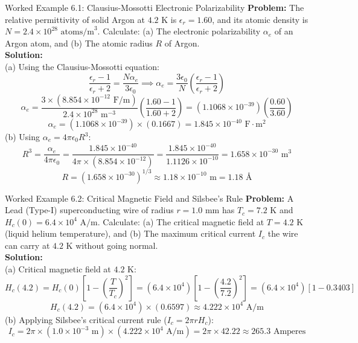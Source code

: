\begin{examplebox}{Worked Example 6.1: Clausius-Mossotti Electronic Polarizability}
\textbf{Problem:} The relative permittivity of solid Argon at $4.2\text{ K}$ is $\epsilon_r = 1.60$, and its atomic density is $N = 2.4 \times 10^{28}\text{ atoms/m}^3$. Calculate: (a) The electronic polarizability $\alpha_e$ of an Argon atom, and (b) The atomic radius $R$ of Argon.\\
\textbf{Solution:}\\
(a) Using the Clausius-Mossotti equation:
\[
\frac{\epsilon_r - 1}{\epsilon_r + 2} = \frac{N \alpha_e}{3\epsilon_0} \implies \alpha_e = \frac{3\epsilon_0}{N}\left(\frac{\epsilon_r - 1}{\epsilon_r + 2}\right)
\]
\[
\alpha_e = \frac{3 \times (8.854 \times 10^{-12}\text{ F/m})}{2.4 \times 10^{28}\text{ m}^{-3}} \left(\frac{1.60 - 1}{1.60 + 2}\right) = (1.1068 \times 10^{-39})\left(\frac{0.60}{3.60}\right)
\]
\[
\alpha_e = (1.1068 \times 10^{-39}) \times (0.1667) = 1.845 \times 10^{-40}\text{ F}\cdot\text{m}^2
\]
(b) Using $\alpha_e = 4\pi\epsilon_0 R^3$:
\[
R^3 = \frac{\alpha_e}{4\pi\epsilon_0} = \frac{1.845 \times 10^{-40}}{4\pi \times (8.854 \times 10^{-12})} = \frac{1.845 \times 10^{-40}}{1.1126 \times 10^{-10}} = 1.658 \times 10^{-30}\text{ m}^3
\]
\[
R = (1.658 \times 10^{-30})^{1/3} \approx 1.18 \times 10^{-10}\text{ m} = 1.18\text{ \AA}
\]
\end{examplebox}

\begin{examplebox}{Worked Example 6.2: Critical Magnetic Field and Silsbee's Rule}
\textbf{Problem:} A Lead (Type-I) superconducting wire of radius $r = 1.0\text{ mm}$ has $T_c = 7.2\text{ K}$ and $H_c(0) = 6.4 \times 10^4\text{ A/m}$. Calculate: (a) The critical magnetic field at $T = 4.2\text{ K}$ (liquid helium temperature), and (b) The maximum critical current $I_c$ the wire can carry at $4.2\text{ K}$ without going normal.\\
\textbf{Solution:}\\
(a) Critical magnetic field at $4.2\text{ K}$:
\[
H_c(4.2) = H_c(0)\left[ 1 - \left(\frac{T}{T_c}\right)^2 \right] = (6.4 \times 10^4)\left[ 1 - \left(\frac{4.2}{7.2}\right)^2 \right] = (6.4 \times 10^4)[1 - 0.3403]
\]
\[
H_c(4.2) = (6.4 \times 10^4) \times (0.6597) \approx 4.222 \times 10^4\text{ A/m}
\]
(b) Applying Silsbee's critical current rule ($I_c = 2\pi r H_c$):
\[
I_c = 2\pi \times (1.0 \times 10^{-3}\text{ m}) \times (4.222 \times 10^4\text{ A/m}) = 2\pi \times 42.22 \approx 265.3\text{ Amperes}
\]
\end{examplebox}

